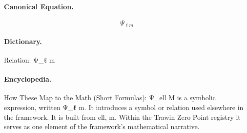 \paragraph{Canonical Equation.}
\[
\Psi_{\ell m}
\]

\paragraph{Dictionary.}
Relation: Ψ\_ℓ m

\paragraph{Encyclopedia.}
How These Map to the Math (Short Formulas): Ψ\_ell M is a symbolic expression, written Ψ\_ℓ m. It introduces a symbol or relation used elsewhere in the framework. It is built from ell, m. Within the Trawin Zero Point registry it serves as one element of the framework's mathematical narrative.
